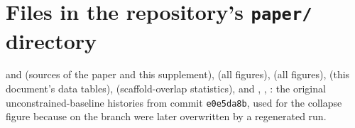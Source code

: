 \documentclass[10pt,letterpaper]{article}
\begin{document}
\section{Files in the repository's \texttt{paper/} directory}
 and  (sources of the paper and this supplement),  (all figures),  (all figures),  (this document's data tables),  (scaffold-overlap statistics), and , , : the original unconstrained-baseline histories from commit \texttt{e0e5da8b}, used for the collapse figure because  on the branch were later overwritten by a regenerated run.
\end{document}
